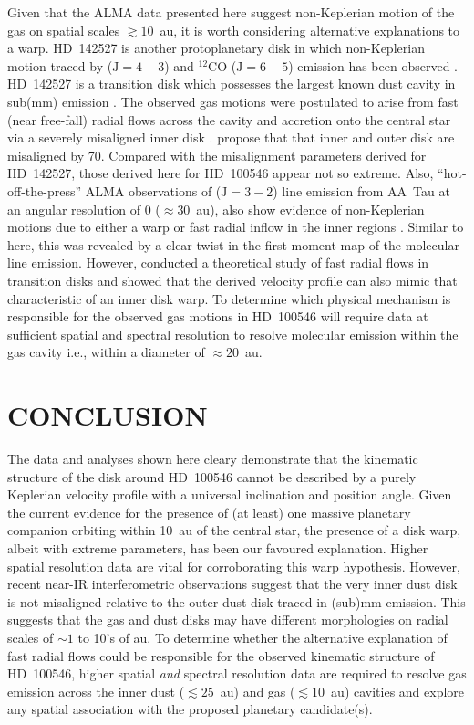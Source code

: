 \documentclass[onecolumn]{aastex6}
\begin{document}
Given that the ALMA data presented here 
suggest non-Keplerian motion of the gas on spatial 
scales $\gtrsim 10$~au, it is worth considering alternative 
explanations to a warp.  
HD~142527 is another protoplanetary disk in which  
non-Keplerian motion traced by  
($\mathrm{J}=4-3$) and $^{12}$CO ($\mathrm{J}=6-5$) 
emission has been observed \citep{casassus13,casassus15}.  
HD~142527 is a transition disk which possesses the largest known
dust cavity in sub(mm) emission 
\citep[$\approx 140$~au;][]{casassus13,fukagawa13}. 
The observed gas motions were postulated to arise from fast 
(near free-fall) radial flows across the cavity and 
accretion onto the central star via a severely misaligned inner disk 
\citep{casassus13,casassus15,marino15}.  
\citet{marino15} propose that that inner and outer disk are misaligned 
by 70\degree.  
Compared with the misalignment parameters derived for HD~142527, those 
derived here for HD~100546 appear not so extreme.  
Also, ``hot-off-the-press'' ALMA observations of 
 ($\mathrm{J}=3-2$) line emission from AA~Tau at an angular 
resolution of 0 ($\approx 30$~au), also show evidence of non-Keplerian motions due 
to either a warp or fast radial inflow in the inner regions  \citep{loomis17}.  
Similar to here, this was revealed by a clear twist in the first 
moment map of the molecular line emission.  
However, \citet{rosenfeld14} conducted a theoretical study of 
fast radial flows in transition disks and showed that the 
derived velocity profile can also mimic that characteristic of an inner 
disk warp.  
To determine which physical mechanism is responsible for the 
observed gas motions in HD~100546 will require data at sufficient 
spatial and spectral resolution to resolve molecular emission within 
the gas cavity i.e., within a diameter of $\approx 20$~au.  

\section{CONCLUSION}
\label{conclusion}

The data and analyses shown here cleary demonstrate that 
the kinematic structure of the disk around HD~100546 cannot be 
described by a purely Keplerian velocity profile with a universal inclination 
and position angle.  
Given the current evidence for the presence of (at least) 
one massive planetary companion orbiting within 10~au of the central 
star, the presence of a disk warp, albeit with extreme parameters, 
has been our favoured explanation.  
Higher spatial resolution data are vital for corroborating 
this warp hypothesis.  
However, recent near-IR interferometric observations 
suggest that the very inner dust disk is not misaligned 
relative to the outer dust disk traced in (sub)mm emission.
This suggests that the gas and dust disks may have different morphologies 
on radial scales of $\sim 1$ to 10's of au.  
To determine whether the alternative explanation of fast radial flows could be 
responsible for the observed kinematic structure of HD~100546, higher spatial 
{\em and} spectral resolution data are required to resolve gas emission across 
the inner dust ($\lesssim 25$~au) and gas ($\lesssim 10$~au) cavities 
and explore any spatial association with the proposed planetary candidate(s). 
\end{document}
